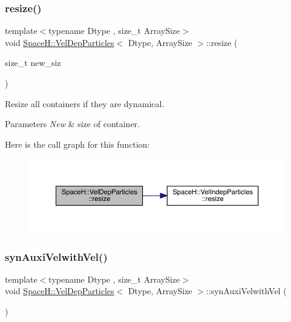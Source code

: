 \subsubsection{\texorpdfstring{resize()}{resize()}}
{\footnotesize\ttfamily template$<$typename Dtype , size\+\_\+t Array\+Size$>$ \\
void \mbox{\hyperlink{class_space_h_1_1_vel_dep_particles}{Space\+H\+::\+Vel\+Dep\+Particles}}$<$ Dtype, Array\+Size $>$\+::resize (\begin{DoxyParamCaption}\item[{size\+\_\+t}]{new\+\_\+siz }\end{DoxyParamCaption})\hspace{0.3cm}{\ttfamily [inline]}}



Resize all containers if they are dynamical. 


\begin{DoxyParams}{Parameters}
{\em New} & size of container. \\
\hline
\end{DoxyParams}
Here is the call graph for this function\+:
\nopagebreak
\begin{figure}[H]
\begin{center}
\leavevmode
\includegraphics[width=350pt]{class_space_h_1_1_vel_dep_particles_a38c984c371c95273fded00e1810473f9_cgraph}
\end{center}
\end{figure}
\mbox{\label{class_space_h_1_1_vel_dep_particles_a5eb56f88aeb302c96e9fe1bcde1fad2f}} 
\subsubsection{\texorpdfstring{syn\+Auxi\+Velwith\+Vel()}{synAuxiVelwithVel()}}
{\footnotesize\ttfamily template$<$typename Dtype , size\+\_\+t Array\+Size$>$ \\
void \mbox{\hyperlink{class_space_h_1_1_vel_dep_particles}{Space\+H\+::\+Vel\+Dep\+Particles}}$<$ Dtype, Array\+Size $>$\+::syn\+Auxi\+Velwith\+Vel (\begin{DoxyParamCaption}{ }\end{DoxyParamCaption})\hspace{0.3cm}{\ttfamily [inline]}}



